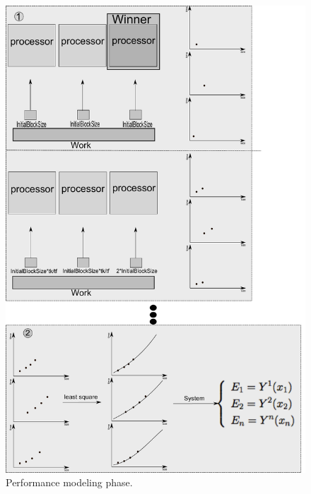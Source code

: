 \documentclass[journal]{IEEEtran}
\begin{document}
\begin{figure}[!t]
	\centering
	\includegraphics[scale=0.28]{NovaFigura_Algoritmo.pdf} 
	\caption{Performance modeling phase.}
	\label{fig: algoritmo}
\end{figure}

\end{document}
